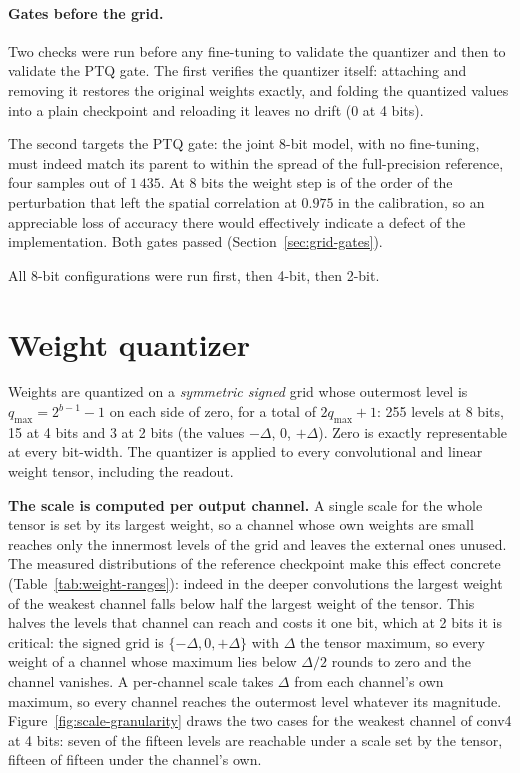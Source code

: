 \paragraph{Gates before the grid.} Two checks were run before any fine-tuning
to validate the quantizer and then to validate the PTQ gate.
The first verifies the quantizer itself: attaching and removing it restores the
original weights exactly, and folding the quantized values into a plain
checkpoint and reloading it leaves no drift ($0$ at 4 bits).

The second targets the
PTQ gate: the joint 8-bit model, with no fine-tuning, must indeed match its parent to
within the spread of the full-precision reference, four samples out of
$1\,435$. At 8 bits the weight step is of the order of the perturbation that
left the spatial correlation at $0.975$ in the calibration, so an appreciable
loss of accuracy there would effectively indicate a defect of the implementation.
Both gates passed (Section~\ref{sec:grid-gates}).

All 8-bit configurations were run first, then 4-bit, then 2-bit.

\section{Weight quantizer}
\label{sec:weight-quantizer}

Weights are quantized on a \emph{symmetric signed} grid whose outermost level is
$q_{\max} = 2^{b-1} - 1$ on each side of zero, for a total of $2q_{\max} + 1$:
255 levels at 8 bits, 15 at 4 bits and 3 at 2 bits (the values $-\Delta$, $0$,
$+\Delta$). Zero is exactly representable at every bit-width. The quantizer is
applied to every convolutional and linear weight tensor, including the readout.

\textbf{The scale is computed per output channel.} A single scale for the whole
tensor is set by its largest weight, so a channel whose own weights are small
reaches only the innermost levels of the grid and leaves the external ones unused. The
measured distributions of the reference checkpoint make this effect concrete
(Table~\ref{tab:weight-ranges}): indeed in the deeper convolutions the largest weight
of the weakest channel falls below half the largest weight of the tensor. This
halves the levels that channel can reach and costs it one bit, which at 2 bits it is 
critical: the signed grid is $\{-\Delta, 0, +\Delta\}$ with $\Delta$
the tensor maximum, so every weight of a channel whose maximum lies below
$\Delta/2$ rounds to zero and the channel vanishes. A per-channel scale takes
$\Delta$ from each channel's own maximum, so every channel reaches the
outermost level whatever its magnitude. Figure~\ref{fig:scale-granularity} draws the two
cases for the weakest channel of conv4 at 4 bits: seven of the fifteen levels
are reachable under a scale set by the tensor, fifteen of fifteen under the
channel's own.

